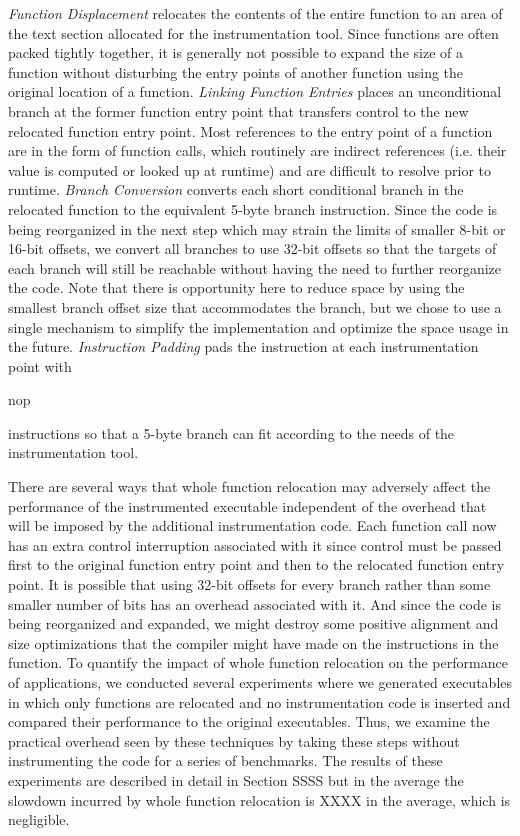 \textit{Function Displacement} relocates the contents of the entire function to an area of the text section allocated
for the instrumentation tool. Since functions are often packed tightly together, it is generally not possible to
expand the size of a function without disturbing the entry points of another function using the original location of a function. 
\textit{Linking Function Entries} places an unconditional branch at the former function entry point that transfers control
to the new relocated function entry point. Most references to the entry point of a function are in the form of function calls, which
routinely are indirect references (i.e. their value is computed or looked up at runtime) and are difficult to resolve
prior to runtime. \textit{Branch Conversion} converts each short conditional branch in the relocated function to the equivalent
5-byte branch instruction. Since the code is being reorganized in the next step which may strain the limits of
smaller 8-bit or 16-bit offsets, we convert all branches to use 32-bit offsets so that the targets of each branch
will still be reachable without having the need to further reorganize the code. Note that there is opportunity
here to reduce space by using the smallest branch offset size that accommodates the branch, but we chose to use a single 
mechanism to simplify the implementation and optimize the space usage in the future. \textit{Instruction Padding} pads
the instruction at each instrumentation point with \begin{it}nop\end{it} instructions so that a 5-byte branch can fit
 according to the needs of the instrumentation tool. 

There are several ways that whole function relocation may adversely affect 
the performance of the instrumented executable independent of the overhead
that will be imposed by the additional instrumentation code. Each function call
now has an extra control interruption associated with it since control must be passed first to the original function entry
point and then to the relocated function entry point. It is possible that using 32-bit offsets for every branch rather than
some smaller number of bits has an overhead associated with it. And since the code is being reorganized and expanded, 
we might destroy some positive alignment and size optimizations that the compiler might have made on the instructions in the
function. To quantify the impact of whole function relocation on the performance of applications, we conducted several experiments
where we generated executables in which only functions are relocated and no instrumentation code is inserted and compared 
their performance to the original executables. Thus, we examine the practical overhead seen by these techniques 
by taking these steps without instrumenting the code for a series of benchmarks. The results of these experiments are described 
in detail in Section SSSS but in the average the slowdown incurred by whole function relocation is XXXX in the average, which is
negligible.

